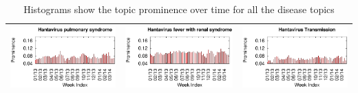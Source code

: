 \documentclass[twoside,leqno,twocolumn]{article}
\begin{document}
\begin{table}[t]
\scriptsize \centering
\captionsetup{font=scriptsize}
\caption{Histograms show the topic prominence over time for all the disease topics}
\begin{tabular}{|lr|lr|lr|}
\hline
\multicolumn{2}{|c|}{\includegraphics[clip,scale=0.4]{fig/topic_hanta_timeline.eps}} & \multicolumn{2}{|c|}{\includegraphics[clip,scale=0.4]{fig/topic_hanta3_timeline.eps}}& 
\multicolumn{2}{|c|}{\includegraphics[clip,scale=0.4]{fig/topic_hanta2_timeline.eps}} \\ \hline

\end{tabular}
\end{table}
\end{document}
